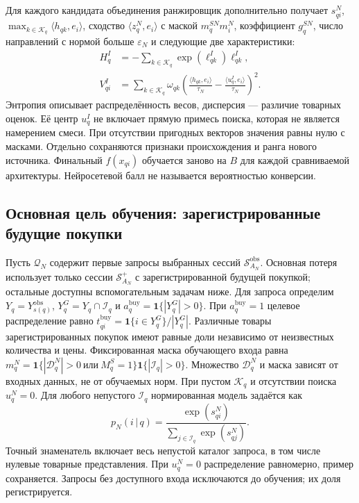 \documentclass[12pt,a4paper]{article}
\newcommand{\ind}{\mathbf 1}
\newcommand{\eps}{\varepsilon}
\newcommand{\given}{\,\vert\,}
\theoremstyle{plainru}
\begin{document}
Для каждого кандидата объединения ранжировщик дополнительно получает
$s_{qi}^{N}$, $\max_{k\in\mathcal K_q}\langle h_{qk},e_i\rangle$,
сходство $\langle z_q^N,e_i\rangle$ с маской $m_q^{SN}m_i^N$,
коэффициент $g_q^{SN}$,
число направлений с нормой больше $\eps_N$ и следующие две характеристики:
\begin{align}\label{eq:modern-ranking-features}
H_q^I&=-\sum_{k\in\mathcal K_q}\exp(\ell_{qk}^{I})\ell_{qk}^{I},\\
V_{qi}^{I}&=\sum_{k\in\mathcal K_q}\omega_{qk}
\left(\frac{\langle h_{qk},e_i\rangle}{\tau_N}
-\frac{\langle u_q^I,e_i\rangle}{\tau_N}\right)^2.
\nonumber
\end{align}
Энтропия описывает распределённость весов, дисперсия --- различие
товарных оценок. Её центр $u_q^I$ не включает прямую примесь поиска,
которая не является намерением смеси.
При отсутствии пригодных векторов значения равны нулю с масками.
Отдельно сохраняются признаки происхождения и ранга нового источника.
Финальный $f(x_{qi})$ обучается заново на $B$ для каждой сравниваемой
архитектуры. Нейросетевой балл не называется вероятностью конверсии.

\subsection{Основная цель обучения: зарегистрированные будущие покупки}
\label{sec:modern-objective}

Пусть $\mathcal Q_N$ содержит первые запросы выбранных сессий
$\mathcal S_{A_N}^{\mathrm{obs}}$. Основная потеря использует только сессии
$\mathcal S_{A_N}^{+}$ с зарегистрированной будущей покупкой;
остальные доступны вспомогательным задачам ниже. Для запроса определим
$Y_q=Y_{s(q)}^{\mathrm{obs}}$, $Y_q^G=Y_q\cap\mathcal I_q$ и
$a_q^{\mathrm{buy}}=\ind\{|Y_q^G|>0\}$.
При $a_q^{\mathrm{buy}}=1$ целевое распределение равно
$t_{qi}^{\mathrm{buy}}=\ind\{i\in Y_q^G\}/|Y_q^G|$.
Различные товары зарегистрированных покупок имеют равные доли независимо
от неизвестных количества и цены.
Фиксированная маска обучающего входа равна
$m_q^N=\ind\{|\mathcal D_q^N|>0\ \text{или}\ M_q^S=1\}
\ind\{|\mathcal I_q|>0\}$.
Множество $\mathcal D_q^N$ и маска зависят от входных данных,
не от обучаемых норм.
При пустом $\mathcal K_q$ и отсутствии поиска $u_q^N=0$.
Для любого непустого $\mathcal I_q$ нормированная модель задаётся как
\begin{equation}\label{eq:modern-softmax}
p_N(i\given q)=\frac{\exp(s_{qi}^{N})}
{\sum_{j\in\mathcal I_q}\exp(s_{qj}^{N})}.
\end{equation}
Точный знаменатель включает весь непустой каталог запроса,
в том числе нулевые товарные представления. При $u_q^N=0$ распределение
равномерно, пример сохраняется. Запросы без доступного входа
исключаются до обучения; их доля регистрируется.
\end{document}
